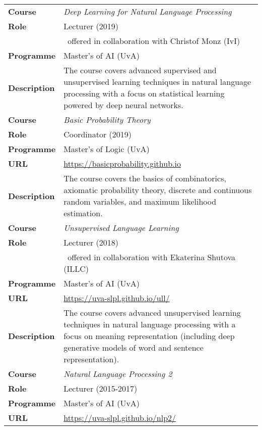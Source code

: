 \begin{center}
\begin{tabular}{l p{}} \hline
{\bf Course} & {\it Deep Learning for Natural Language Processing} \\
{\bf Role}   & Lecturer (2019) \\
 & ~offered in collaboration with Christof Monz (IvI)\\
{\bf Programme} & Master's of AI (UvA)\\
{\bf Description} & The course covers advanced supervised and unsupervised learning techniques in natural language processing with a focus on statistical learning powered by deep neural networks.
\\ \hline
{\bf Course} & {\it Basic Probability Theory} \\
{\bf Role}   & Coordinator (2019) \\
{\bf Programme} & Master's of Logic (UvA)\\
{\bf URL} & \url{https://basicprobability.github.io} \\
{\bf Description} & The course covers the basics of combinatorics, axiomatic probability theory, discrete and continuous random variables, and maximum likelihood estimation. 
\\ \hline
{\bf Course} & {\it Unsupervised Language Learning} \\
{\bf Role}   & Lecturer (2018) \\
 & ~offered in collaboration with Ekaterina Shutova (ILLC)\\
{\bf Programme} & Master's of AI (UvA)\\
{\bf URL} & \url{https://uva-slpl.github.io/ull/} \\
{\bf Description} & The course covers advanced unsupervised learning techniques in natural language processing with a focus on meaning representation (including deep generative models of word and sentence representation).
\\ \hline
{\bf Course} & {\it Natural Language Processing 2} \\
{\bf Role}   & Lecturer (2015-2017) \\
{\bf Programme} & Master's of AI (UvA)\\
{\bf URL} & \url{https://uva-slpl.github.io/nlp2/} \\

\end{tabular}
\end{center}
